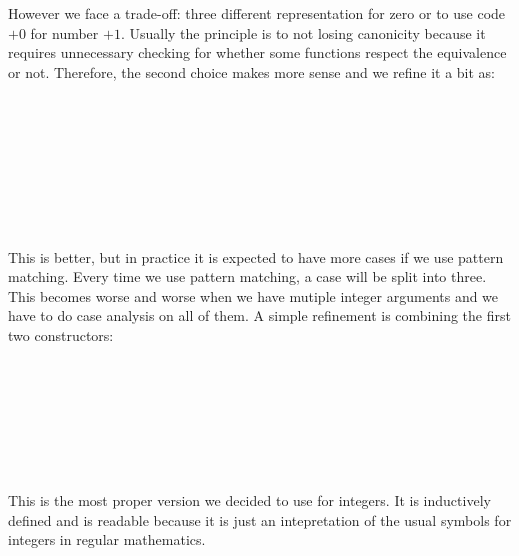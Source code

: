 However we face a trade-off: three different representation for zero or
to use code $+0$ for number $+1$. Usually the principle is to not
losing canonicity because it requires unnecessary checking for whether
some functions respect the equivalence or not. Therefore, the second
choice makes more sense and we refine it a bit as:

\begin{code}
\\
%
\\
\>  \AgdaSymbol{:}  \<%
\\
\>[0]\<[2]%
\>[2] \AgdaSymbol{:}   \<%
\\
\>[0]\<[2]%
\>[2] \<[8]%
\>[8]\AgdaSymbol{:} \<%
\\
\>[0]\<[2]%
\>[2] \AgdaSymbol{:}   \<%
\\
%
\\
\>\<\end{code}

This is better, but in practice it is expected to have more cases if
we use pattern matching. Every time we use pattern matching, a case will be
split into three. This becomes worse and worse when we have mutiple integer
arguments and we have to do case analysis on all of them. A simple
refinement is combining the first two constructors:

\begin{code}
\\
%
\\
\>  \AgdaSymbol{:}  \<%
\\
\>[0]\<[2]%
\>[2]\AgdaInductiveConstructor{+\_} \<[8]%
\>[8]\AgdaSymbol{:}   \<%
\\
\>[0]\<[2]%
\>[2] \AgdaSymbol{:}   \<%
\\
%
\\
\>\<\end{code}

This is the most proper version we decided to use for integers. It is
inductively defined and is readable because it is just an
intepretation of the usual symbols for integers in regular mathematics.

